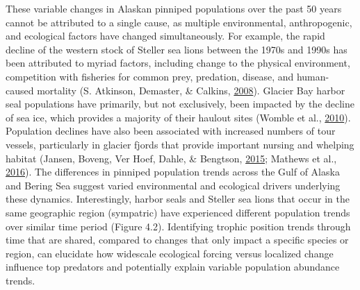 \documentclass [11pt, proquest] {uwthesis}[2015/03/03]
\begin{document}
These variable changes in Alaskan pinniped populations over the past 50
years cannot be attributed to a single cause, as multiple environmental,
anthropogenic, and ecological factors have changed simultaneously. For
example, the rapid decline of the western stock of Steller sea lions
between the 1970s and 1990s has been attributed to myriad factors,
including change to the physical environment, competition with fisheries
for common prey, predation, disease, and human-caused mortality (S.
Atkinson, Demaster, \& Calkins,
\protect\hyperlink{ref-Atkinson2008}{2008}). Glacier Bay harbor seal
populations have primarily, but not exclusively, been impacted by the
decline of sea ice, which provides a majority of their haulout sites
(Womble et al., \protect\hyperlink{ref-Womble2010}{2010}). Population
declines have also been associated with increased numbers of tour
vessels, particularly in glacier fjords that provide important nursing
and whelping habitat (Jansen, Boveng, Ver Hoef, Dahle, \& Bengtson,
\protect\hyperlink{ref-Jansen2015}{2015}; Mathews et al.,
\protect\hyperlink{ref-Mathews2016}{2016}). The differences in pinniped
population trends across the Gulf of Alaska and Bering Sea suggest
varied environmental and ecological drivers underlying these dynamics.
Interestingly, harbor seals and Steller sea lions that occur in the same
geographic region (sympatric) have experienced different population
trends over similar time period (Figure 4.2). Identifying trophic
position trends through time that are shared, compared to changes that
only impact a specific species or region, can elucidate how widescale
ecological forcing versus localized change influence top predators and
potentially explain variable population abundance trends.
\end{document}
